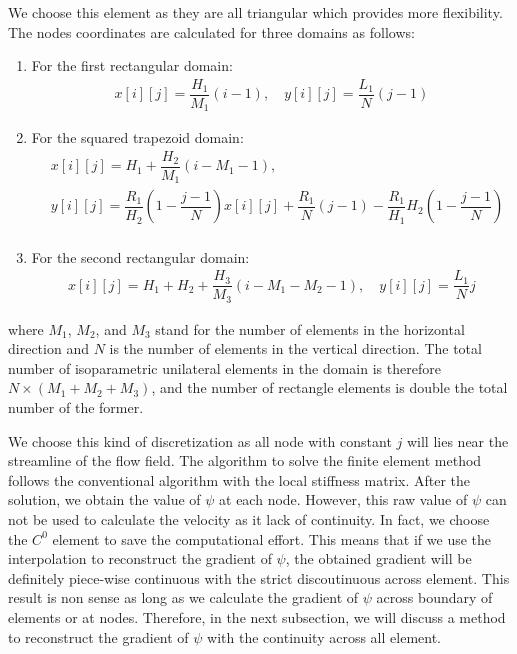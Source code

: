 \documentclass[12pt]{book}
\theoremstyle{bfnote}
\theoremstyle{bfnote}
\begin{document}
We choose this element as they are all triangular which provides more flexibility. The nodes coordinates are calculated for three domains as follows:
\begin{enumerate}
    \item For the first rectangular domain:
    \begin{align}
        x[i][j] = \dfrac{H_1}{M_1}(i - 1), \quad y[i][j] = \dfrac{L_1}{N}(j - 1)
    \end{align}
    \item For the squared trapezoid domain:
    \begin{equation}
        \begin{aligned}
            & x[i][j] = H_1 + \dfrac{H_2}{M_1}(i - M_1 - 1), \\
            & y[i][j] = \dfrac{R_1}{H_2} \left( 1 - \dfrac{j - 1}{N} \right) x[i][j] + \dfrac{R_1}{N}(j - 1) - \dfrac{R_1}{H_1} H_2 \left( 1 - \dfrac{j - 1}{N} \right) \\
        \end{aligned}
    \end{equation}
    \item For the second rectangular domain:
    \begin{align}
        x[i][j] = H_1 + H_2 + \dfrac{H_3}{M_3}(i - M_1 - M_2 - 1), \quad y[i][j] = \dfrac{L_1}{N}j
    \end{align}
\end{enumerate}
where $M_1$, $M_2$, and $M_3$ stand for the number of elements in the horizontal direction and $N$ is the number of elements in the vertical direction. The total number of isoparametric unilateral elements in the domain is therefore $N \times (M_1 + M_2 + M_3)$, and the number of rectangle elements is double the total number of the former.

We choose this kind of discretization as all node with constant $j$ will lies near the streamline of the flow field. The algorithm to solve the finite element method follows the conventional algorithm with the local stiffness matrix. After the solution, we obtain the value of $\psi$ at each node. However, this raw value of $\psi$ can not be used to calculate the velocity as it lack of continuity. In fact, we choose the $C^0$ element to save the computational effort. This means that if we use the interpolation to reconstruct the gradient of $\psi$, the obtained gradient will be definitely piece-wise continuous with the strict discoutinuous across element. This result is non sense as long as we calculate the gradient of $\psi$ across boundary of elements or at nodes. Therefore, in the next subsection, we will discuss a method to reconstruct the gradient of $\psi$ with the continuity across all element.
\end{document}
